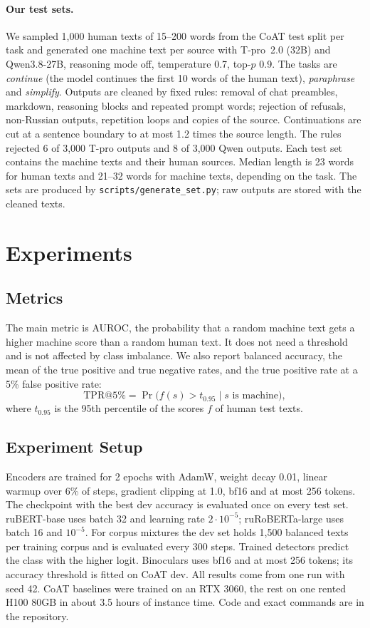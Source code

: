 \documentclass{article}
\begin{document}
\paragraph{Our test sets.} We sampled 1,000 human texts of 15--200 words from the CoAT test split per task and
generated one machine text per source with T-pro~2.0 (32B) and Qwen3.8-27B, reasoning mode off, temperature 0.7,
top-$p$ 0.9. The tasks are \emph{continue} (the model continues the first 10 words of the human text),
\emph{paraphrase} and \emph{simplify}. Outputs are cleaned by fixed rules: removal of chat preambles, markdown,
reasoning blocks and repeated prompt words; rejection of refusals, non-Russian outputs, repetition loops and
copies of the source. Continuations are cut at a sentence boundary to at most 1.2 times the source length. The
rules rejected 6 of 3,000 T-pro outputs and 8 of 3,000 Qwen outputs. Each test set contains the machine texts
and their human sources. Median length is 23 words for human texts and 21--32 words for machine texts, depending
on the task. The sets are produced by \texttt{scripts/generate\_set.py}; raw outputs are stored with the cleaned
texts.


\section{Experiments}
\subsection{Metrics}
The main metric is AUROC, the probability that a random machine text gets a higher machine score than a random
human text. It does not need a threshold and is not affected by class imbalance. We also report balanced
accuracy, the mean of the true positive and true negative rates, and the true positive rate at a 5\% false
positive rate:
$$\mathrm{TPR@5\%} = \Pr\big(f(s) > t_{0.95} \mid s \text{ is machine}\big),$$
where $t_{0.95}$ is the 95th percentile of the scores $f$ of human test texts.

\subsection{Experiment Setup}
Encoders are trained for 2 epochs with AdamW, weight decay 0.01, linear warmup over 6\% of steps, gradient
clipping at 1.0, bf16 and at most 256 tokens. The checkpoint with the best dev accuracy is evaluated once on
every test set. ruBERT-base uses batch 32 and learning rate $2\cdot10^{-5}$; ruRoBERTa-large uses batch 16 and
$10^{-5}$. For corpus mixtures the dev set holds 1,500 balanced texts per training corpus and is evaluated every
300 steps. Trained detectors predict the class with the higher logit. Binoculars uses bf16 and at most 256 tokens; its accuracy threshold is fitted on CoAT dev. All results
come from one run with seed 42. CoAT baselines were trained on an RTX 3060, the rest on one rented H100 80GB in
about 3.5 hours of instance time. Code and exact commands are in the repository.
\end{document}

